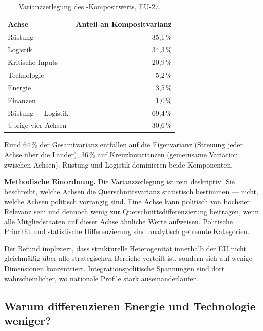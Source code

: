 \begin{table}[htbp]
\centering\small
\caption{Varianzzerlegung des \ISI-Kompositwerts, EU-27.}
\label{tab:varianz}
\begin{tabular}{@{}lr@{}}
\toprule
\textbf{Achse} & \textbf{Anteil an Kompositvarianz} \\
\midrule
R\"ustung          & 35{,}1\,\% \\
Logistik           & 34{,}3\,\% \\
Kritische Inputs   & 20{,}9\,\% \\
Technologie        &  5{,}2\,\% \\
Energie            &  3{,}5\,\% \\
Finanzen           &  1{,}0\,\% \\
\midrule
R\"ustung + Logistik     & 69{,}4\,\% \\
\"Ubrige vier Achsen     & 30{,}6\,\% \\
\bottomrule
\end{tabular}
\end{table}

\begin{sloppypar}
Rund 64\,\% der Gesamtvarianz entfallen auf die Eigenvarianz
(Streuung jeder Achse \"uber die L\"ander), 36\,\% auf
Kreuz\-kovarianzen (gemeinsame Variation zwischen Achsen).
R\"ustung und Logistik dominieren beide Komponenten.
\end{sloppypar}

\textbf{Methodische Einordnung.}
Die Varianzzerlegung ist rein deskriptiv.  Sie beschreibt, welche
Achsen die Querschnittsvarianz statistisch bestimmen --- nicht,
welche Achsen politisch vorrangig sind.  Eine Achse kann politisch
von h\"ochster Relevanz sein und dennoch wenig zur
Querschnittsdifferenzierung beitragen, wenn alle Mitgliedstaaten
auf dieser Achse \"ahnliche Werte aufweisen.  Politische
Priorit\"at und statistische Differenzierung sind analytisch
getrennte Kategorien.

\begin{sloppypar}
Der Befund impliziert, dass strukturelle Heterogenit\"at innerhalb
der EU nicht gleichm\"a\ss ig \"uber alle strategischen Bereiche
verteilt ist, sondern sich auf wenige Dimensionen konzentriert.
Integrations\-politische Spannungen sind dort wahrscheinlicher,
wo nationale Profile stark auseinanderlaufen.
\end{sloppypar}

\subsection{Warum differenzieren Energie und Technologie weniger?}

